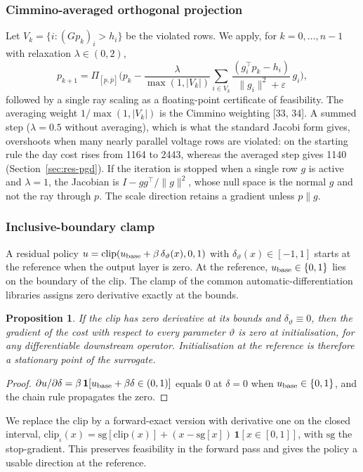 \documentclass[11pt]{article}
\newtheorem{prop}{Proposition}
\begin{document}
\subsubsection{Cimmino-averaged orthogonal projection}
Let $V_k=\{i:(Gp_k)_i>h_i\}$ be the violated rows. We apply, for $k=0,\dots,n-1$ with relaxation $\lambda\in(0,2)$,
\begin{equation}
p_{k+1}=\Pi_{[\underline p,\bar p]}\Big(p_k-\frac{\lambda}{\max(1,|V_k|)}\sum_{i\in V_k}\frac{(g_i^\top p_k-h_i)}{\|g_i\|^2+\varepsilon}\,g_i\Big),
\end{equation}
followed by a single ray scaling as a floating-point certificate of feasibility. The averaging weight $1/\max(1,|V_k|)$ is the Cimmino weighting [33, 34]. A summed step ($\lambda=0.5$ without averaging), which is what the standard Jacobi form gives, overshoots when many nearly parallel voltage rows are violated: on the starting rule the day cost rises from 1164 to 2443, whereas the averaged step gives 1140 (Section~\ref{sec:res-pgd}). If the iteration is stopped when a single row $g$ is active and $\lambda=1$, the Jacobian is $I-gg^\top/\|g\|^2$, whose null space is the normal $g$ and not the ray through $p$. The scale direction retains a gradient unless $p\parallel g$.

\subsubsection{Inclusive-boundary clamp}
A residual policy $u=\mathrm{clip}(u_{\rm base}+\beta\,\delta_\vartheta(x),0,1)$ with $\delta_\vartheta(x)\in[-1,1]$ starts at the reference when the output layer is zero. At the reference, $u_{\rm base}\in\{0,1\}$ lies on the boundary of the clip. The clamp of the common automatic-differentiation libraries assigns zero derivative exactly at the bounds.
\begin{prop}\label{prop:clip}
If the clip has zero derivative at its bounds and $\delta_\vartheta\equiv0$, then the gradient of the cost with respect to every parameter $\vartheta$ is zero at initialisation, for any differentiable downstream operator. Initialisation at the reference is therefore a stationary point of the surrogate.
\end{prop}
\begin{proof}
$\partial u/\partial\delta=\beta\,\mathbf 1[u_{\rm base}+\beta\delta\in(0,1)]$ equals $0$ at $\delta=0$ when $u_{\rm base}\in\{0,1\}$, and the chain rule propagates the zero.
\end{proof}
We replace the clip by a forward-exact version with derivative one on the closed interval,
$\mathrm{clip}_\iota(x)=\mathrm{sg}[\mathrm{clip}(x)]+(x-\mathrm{sg}[x])\,\mathbf 1[x\in[0,1]]$, with $\mathrm{sg}$ the stop-gradient. This preserves feasibility in the forward pass and gives the policy a usable direction at the reference.
\end{document}
